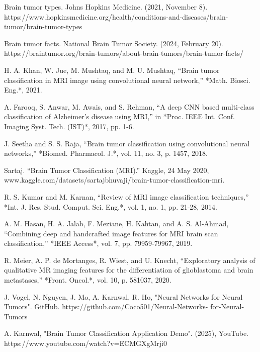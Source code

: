 \documentclass[conference]{IEEEtran}
\begin{document}
\begin{thebibliography}{00}

Brain tumor types. Johns Hopkins Medicine. (2021, November 8). https://www.hopkinsmedicine.org/health/conditions-and-diseases/brain-tumor/brain-tumor-types 

Brain tumor facts. National Brain Tumor Society. (2024, February 20). https://braintumor.org/brain-tumors/about-brain-tumors/brain-tumor-facts/ 

H. A. Khan, W. Jue, M. Mushtaq, and M. U. Mushtaq, “Brain tumor classification in MRI image using convolutional neural network,” *Math. Biosci. Eng.*, 2021. 

A. Farooq, S. Anwar, M. Awais, and S. Rehman, “A deep CNN based multi-class classification of Alzheimer's disease using MRI,” in *Proc. IEEE Int. Conf. Imaging Syst. Tech. (IST)*, 2017, pp. 1-6. 

J. Seetha and S. S. Raja, “Brain tumor classification using convolutional neural networks,” *Biomed. Pharmacol. J.*, vol. 11, no. 3, p. 1457, 2018.

Sartaj. “Brain Tumor Classification (MRI).” Kaggle, 24 May 2020, www.kaggle.com/datasets/sartajbhuvaji/brain-tumor-classification-mri. 

R. S. Kumar and M. Karnan, “Review of MRI image classification techniques,” *Int. J. Res. Stud. Comput. Sci. Eng.*, vol. 1, no. 1, pp. 21-28, 2014. 

A. M. Hasan, H. A. Jalab, F. Meziane, H. Kahtan, and A. S. Al-Ahmad, “Combining deep and handcrafted image features for MRI brain scan classification,” *IEEE Access*, vol. 7, pp. 79959-79967, 2019. 

R. Meier, A. P. de Mortanges, R. Wiest, and U. Knecht, “Exploratory analysis of qualitative MR imaging features for the differentiation of glioblastoma and brain metastases,” *Front. Oncol.*, vol. 10, p. 581037, 2020.

J. Vogel, N. Nguyen, J. Mo, A. Karnwal, R. Ho, "Neural Networks for Neural Tumors". GitHub. https://github.com/Coco501/Neural-Networks-
for-Neural-Tumors

A. Karnwal, "Brain Tumor Classification Application Demo". (2025), YouTube. https://www.youtube.com/watch?v=ECMGXgMrji0

\end{thebibliography}
\end{document}
